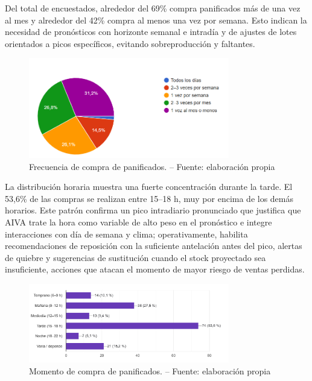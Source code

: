 Del total de encuestados, alrededor del 69\% compra panificados más de una vez al mes y alrededor del 42\% compra al menos una vez por semana. Esto indican la necesidad de pronósticos con horizonte semanal e intradía y de ajustes de lotes orientados a picos específicos, evitando sobreproducción y faltantes.

\begin{figure}[t]
    \centering
    \includegraphics[width=0.78\textwidth]{images/FrecuenciaCompraPanificados.png}
    \caption{Frecuencia de compra de panificados. -- Fuente: elaboración propia}
    \label{fig:frecuencia-compra-panificados}
\end{figure}

La distribución horaria muestra una fuerte concentración durante la tarde. El 53,6\% de las compras se realizan entre 15–18 h, muy por encima de los demás horarios. Este patrón confirma un pico intradiario pronunciado que justifica que AIVA trate la hora como variable de alto peso en el pronóstico e integre interacciones con día de semana y clima; operativamente, habilita recomendaciones de reposición con la suficiente antelación antes del pico, alertas de quiebre y sugerencias de sustitución cuando el stock proyectado sea insuficiente, acciones que atacan el momento de mayor riesgo de ventas perdidas.

\begin{figure}[t]
    \centering
    \includegraphics[width=0.78\textwidth]{images/MomentoDeCompra.png}
    \caption{Momento de compra de panificados. -- Fuente: elaboración propia}
    \label{fig:momento-compra}
\end{figure}


